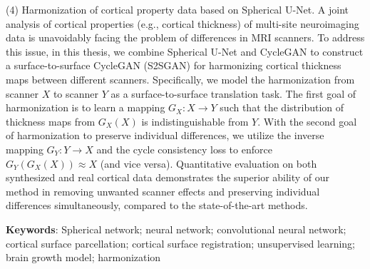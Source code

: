 (4)	Harmonization of cortical property data based on Spherical U-Net. A joint analysis of cortical properties (e.g., cortical thickness) of multi-site neuroimaging data is unavoidably facing the problem of differences in MRI scanners. To address this issue, in this thesis, we combine Spherical U-Net and CycleGAN to construct a surface-to-surface CycleGAN (S2SGAN) for harmonizing cortical thickness maps between different scanners. Specifically, we model the harmonization from scanner $X$ to scanner $Y$ as a surface-to-surface translation task. The first goal of harmonization is to learn a mapping $G_X: X\rightarrow Y$ such that the distribution of thickness maps from $G_X(X)$ is indistinguishable from $Y$. With the second goal of harmonization to preserve individual differences, we utilize the inverse mapping $G_Y: Y\rightarrow X$ and the cycle consistency loss to enforce $G_Y(G_X(X))\approx X$ (and vice versa). Quantitative evaluation on both synthesized and real cortical data demonstrates the superior ability of our method in removing unwanted scanner effects and preserving individual differences simultaneously, compared to the state-of-the-art methods.
 
\textbf{Keywords}: Spherical network; neural network; convolutional neural network; cortical surface parcellation; cortical surface registration; unsupervised learning; brain growth model; harmonization


